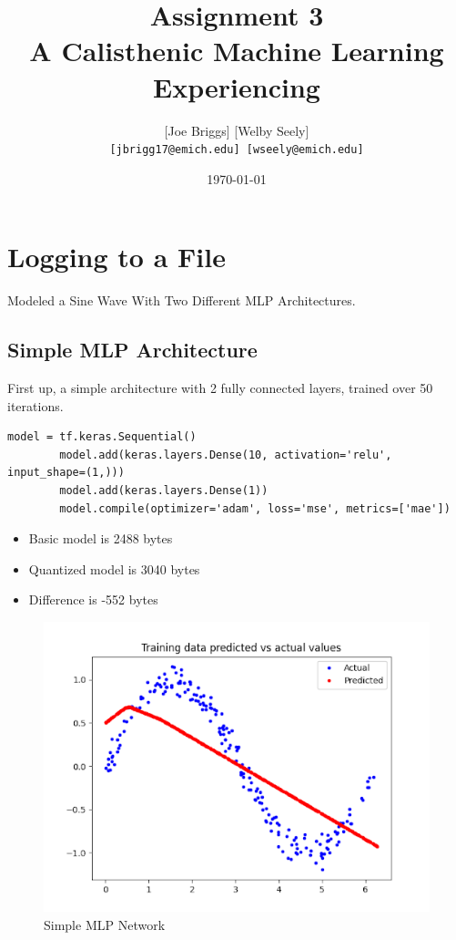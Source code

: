 \documentclass{article}
\title{Assignment 3 \\
\large A Calisthenic Machine Learning Experiencing}
\author{
    [Joe Briggs] [Welby Seely] \\
    \texttt{[jbrigg17@emich.edu] [wseely@emich.edu]}
}
\date{\today}
\begin{document}
    \maketitle


    \section{Logging to a File}\label{sec:preamble}
    Modeled a Sine Wave With Two Different MLP Architectures.

    \subsection{Simple MLP Architecture}
    First up, a simple architecture with 2 fully connected layers, trained over 50 iterations.
    \\
    \begin{lstlisting}[label={lst:mlp1}]
        model = tf.keras.Sequential()
        model.add(keras.layers.Dense(10, activation='relu', input_shape=(1,)))
        model.add(keras.layers.Dense(1))
        model.compile(optimizer='adam', loss='mse', metrics=['mae'])
    \end{lstlisting}

    \begin{itemize}
        \item Basic model is 2488 bytes
        \item Quantized model is 3040 bytes
        \item Difference is -552 bytes
    \end{itemize}

    \begin{figure}[!htbp]
        \centerline{\includegraphics[width=0.8\columnwidth]{simple}}
        \caption{Simple MLP Network}
        \label{fig:simplemlp}
    \end{figure}
\end{document}
